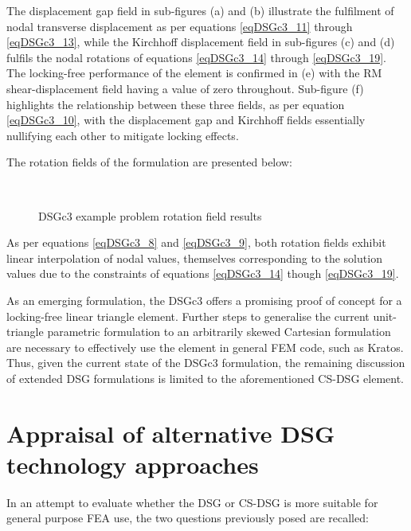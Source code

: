 The displacement gap field in sub-figures (a) and (b) illustrate the fulfilment of nodal transverse displacement as per equations \ref{eqDSGc3_11} through \ref{eqDSGc3_13}, while the Kirchhoff displacement field in sub-figures (c) and (d) fulfils the nodal rotations of equations \ref{eqDSGc3_14} through \ref{eqDSGc3_19}. The locking-free performance of the element is confirmed in (e) with the RM shear-displacement field having a value of zero throughout. Sub-figure (f) highlights the relationship between these three fields, as per equation \ref{eqDSGc3_10}, with the displacement gap and Kirchhoff fields essentially nullifying each other to mitigate locking effects.

The rotation fields of the formulation are presented below:

\begin{figure}[H]
	\\
	\caption{\label{csdsgc3_resul1t}DSGc3 example problem rotation field results}
\end{figure}

As per equations \ref{eqDSGc3_8} and \ref{eqDSGc3_9}, both rotation fields exhibit linear interpolation of nodal values, themselves corresponding to the solution values due to the constraints of equations \ref{eqDSGc3_14} though \ref{eqDSGc3_19}.

As an emerging formulation, the DSGc3 offers a promising proof of concept for a locking-free linear triangle element. Further steps to generalise the current unit-triangle parametric formulation to an arbitrarily skewed Cartesian formulation are necessary to effectively use the element in general FEM code, such as Kratos. Thus, given the current state of the DSGc3 formulation, the remaining discussion of extended DSG formulations is limited to the aforementioned CS-DSG element.

\section{Appraisal of alternative DSG technology approaches}
\label{CSDSG appraisal}
In an attempt to evaluate whether the DSG or CS-DSG is more suitable for general purpose FEA use, the two questions previously posed are recalled:

